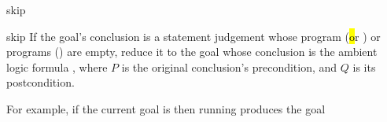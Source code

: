 \begin{tactic}{skip}
  \begin{tsyntax}[empty]{skip} If the goal's conclusion is a statement
    judgement whose program (\hl or \phl) or programs (\prhl) are
    empty, reduce it to the goal whose conclusion is the ambient logic
    formula , where $P$ is the original
    conclusion's precondition, and $Q$ is its postcondition.

  \bigskip
  For example, if the current goal is
   then
  running 
  produces the goal

  \end{tsyntax}
\end{tactic}
